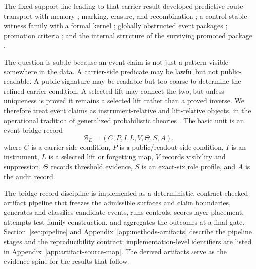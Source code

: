 \documentclass[11pt]{article}
\theoremstyle{definition}
\begin{document}
The fixed-support line leading to that carrier result developed predictive route transport with memory \citep{Tsiokos2026HolonomyMemory}; marking, erasure, and recombination \citep{Tsiokos2026MarkingErasureRecombination}; a control-stable witness family with a formal kernel \citep{Tsiokos2026RecombinationWitnesses}; globally obstructed event packages \citep{Tsiokos2026LocallyBoolean}; promotion criteria \citep{Tsiokos2026PromotionCriteria}; and the internal structure of the surviving promoted package \citep{Tsiokos2026InternalStructure}.

The question is subtle because an event claim is not just a pattern visible somewhere in the data. A carrier-side predicate may be lawful but not public-readable. A public signature may be readable but too coarse to determine the refined carrier condition. A selected lift may connect the two, but unless uniqueness is proved it remains a selected lift rather than a proved inverse. We therefore treat event claims as instrument-relative and lift-relative objects, in the operational tradition of generalized probabilistic theories \citep{Hardy2001Axioms,Plavala2023GPT}. The basic unit is an event bridge record
\[
  \mathcal B_E=(C,P,I,L,V,\Theta,S,A),
\]
where \(C\) is a carrier-side condition, \(P\) is a public/readout-side condition, \(I\) is an instrument, \(L\) is a selected lift or forgetting map, \(V\) records visibility and suppression, \(\Theta\) records threshold evidence, \(S\) is an exact-six role profile, and \(A\) is the audit record.

The bridge-record discipline is implemented as a deterministic, contract-checked artifact pipeline that freezes the admissible surfaces and claim boundaries, generates and classifies candidate events, runs controls, scores layer placement, attempts test-family construction, and aggregates the outcomes at a final gate. Section~\ref{sec:pipeline} and Appendix~\ref{app:methods-artifacts} describe the pipeline stages and the reproducibility contract; implementation-level identifiers are listed in Appendix~\ref{app:artifact-source-map}. The derived artifacts serve as the evidence spine for the results that follow.
\end{document}
